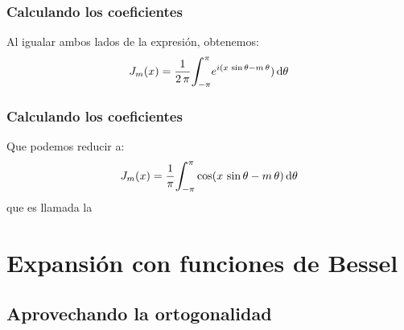 \documentclass[12pt]{beamer}
\begin{document}
\begin{frame}
\frametitle{Calculando los coeficientes}
Al igualar ambos lados de la expresión, obtenemos:
\pause
\begin{equation}
J_{m} (x) = \dfrac{1}{2 \, \pi} \scaleint{6ex}_{\bs -\pi}^{\pi} e^{i (x \, \sin \theta -  m \, \theta}) \dd{\theta}
\label{eq:ecuacion_27_30}
\end{equation}
\end{frame}
\begin{frame}
\frametitle{Calculando los coeficientes}
Que podemos reducir a:
\pause
\begin{equation}
J_{m} (x) = \dfrac{1}{\pi} \scaleint{6ex}_{\bs -\pi}^{\pi} \cos (x \, \sin \theta -  m \, \theta) \dd{\theta}
\label{eq:ecuacion_27_31}
\end{equation}
que es llamada la 
\end{frame}

\section{Expansión con funciones de Bessel}
\subsection{Aprovechando la ortogonalidad}
\end{document}
